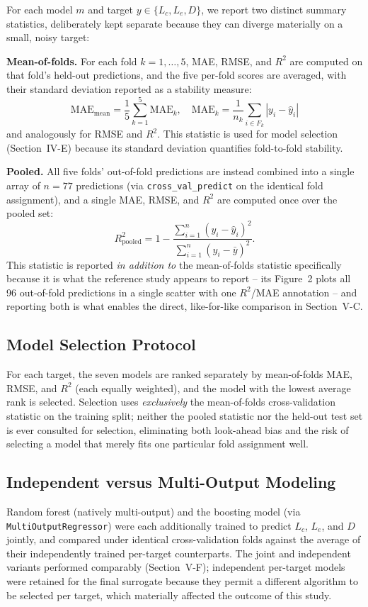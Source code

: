 \documentclass[conference]{IEEEtran}
\begin{document}
For each model $m$ and target $y\in\{L_c,L_e,D\}$, we report two distinct summary statistics, deliberately kept separate because they can diverge materially on a small, noisy target:

\textbf{Mean-of-folds.} For each fold $k=1,\ldots,5$, MAE, RMSE, and $R^2$ are computed on that fold's held-out predictions, and the five per-fold scores are averaged, with their standard deviation reported as a stability measure:
\begin{equation}
\text{MAE}_{\text{mean}} = \frac{1}{5}\sum_{k=1}^{5}\text{MAE}_k, \quad \text{MAE}_k = \frac{1}{n_k}\sum_{i\in F_k}\left|y_i-\hat y_i\right|
\end{equation}
and analogously for RMSE and $R^2$. This statistic is used for model selection (Section~IV-E) because its standard deviation quantifies fold-to-fold stability.

\textbf{Pooled.} All five folds' out-of-fold predictions are instead combined into a single array of $n=77$ predictions (via \texttt{cross\_val\_predict} on the identical fold assignment), and a single MAE, RMSE, and $R^2$ are computed once over the pooled set:
\begin{equation}
R^2_{\text{pooled}} = 1-\frac{\sum_{i=1}^{n}(y_i-\hat y_i)^2}{\sum_{i=1}^{n}(y_i-\bar y)^2}.
\end{equation}
This statistic is reported \emph{in addition to} the mean-of-folds statistic specifically because it is what the reference study \cite{zhang_cheng2022} appears to report -- its Figure~2 plots all 96 out-of-fold predictions in a single scatter with one $R^2$/MAE annotation -- and reporting both is what enables the direct, like-for-like comparison in Section~V-C.

\subsection{Model Selection Protocol}
For each target, the seven models are ranked separately by mean-of-folds MAE, RMSE, and $R^2$ (each equally weighted), and the model with the lowest average rank is selected. Selection uses \emph{exclusively} the mean-of-folds cross-validation statistic on the training split; neither the pooled statistic nor the held-out test set is ever consulted for selection, eliminating both look-ahead bias and the risk of selecting a model that merely fits one particular fold assignment well.

\subsection{Independent versus Multi-Output Modeling}
Random forest (natively multi-output) and the boosting model (via \texttt{MultiOutputRegressor}) were each additionally trained to predict $L_c$, $L_e$, and $D$ jointly, and compared under identical cross-validation folds against the average of their independently trained per-target counterparts. The joint and independent variants performed comparably (Section~V-F); independent per-target models were retained for the final surrogate because they permit a different algorithm to be selected per target, which materially affected the outcome of this study.
\end{document}

